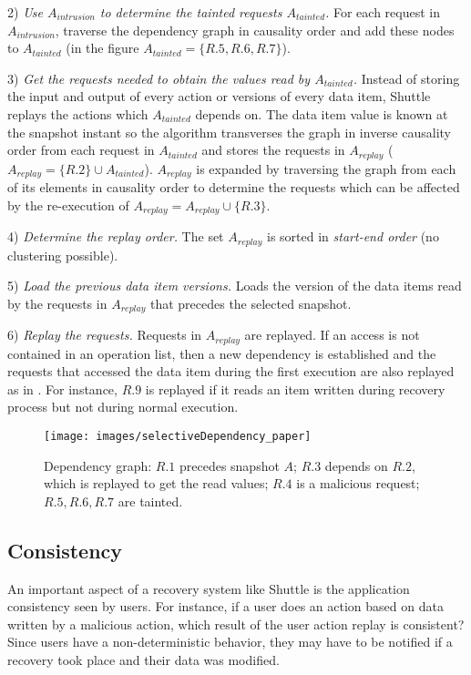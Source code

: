 \documentclass[10pt,conference]{IEEEtran}
\begin{document}
{2)} \textit{Use $A_{intrusion}$ to determine the tainted requests $A_{tainted}$.}
  For each request in $A_{intrusion}$, traverse the dependency graph in causality order and add these nodes to $A_{tainted}$ (in the figure $A_{tainted} = \{R.5,R.6,R.7\}$).

{3)} \textit{Get the requests needed to obtain the values read by $A_{tainted}$.}   Instead of storing the input and output of every action or versions of every data item, Shuttle replays the actions which $A_{tainted}$ depends on. The data item value is known at the snapshot instant so the algorithm transverses the graph in inverse causality order from each request in $A_{tainted}$ and stores the requests in $A_{replay}$ ($A_{replay} = \{R.2\} \cup A_{tainted}$). $A_{replay}$ is expanded by traversing the graph from each of its elements in causality order to determine the requests which can be affected by the re-execution of $A_{replay} = A_{replay} \cup \{R.3\}$. 

{4)} \textit{Determine the replay order.} 
  The set $A_{replay}$ is sorted in \emph{start-end order} (no clustering possible).

{5)} \textit{Load the previous data item versions.}
  Loads the version of the data items read by the requests in $A_{replay}$ that precedes the selected snapshot.

{6)} \textit{Replay the requests.}
  Requests in $A_{replay}$ are replayed. If an access is not contained in an operation list, then a new dependency is established and the requests that accessed the data item during the first execution are also replayed as in \cite{retro}. For instance, $R.9$ is replayed if it reads an item written during recovery process but not during normal execution. 

\begin{figure}
  \centering
  \texttt{[image: images/selectiveDependency\_paper]}
  \caption{{Dependency graph:} $R.1$ precedes snapshot $A$; $R.3$ depends on $R.2$, which is replayed to get the read values; $R.4$ is a malicious request; $R.5,R.6,R.7$ are tainted.}
  \label{fig:selectiveGraph}
\end{figure}


\subsection{Consistency}
\label{sec:recovery:consistency}

An important aspect of a recovery system like Shuttle is the application consistency seen by users. For instance, if a user does an action based on data written by a malicious action, which result of the user action replay is consistent? Since users have a non-deterministic behavior, they may have to be notified if a recovery took place and their data was modified.
\end{document}
